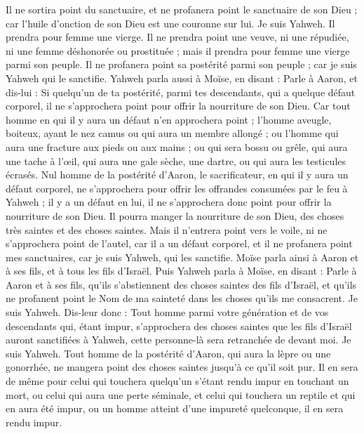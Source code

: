 \begin{multicols}{2}
Il ne sortira point du sanctuaire, et ne profanera point le sanctuaire de son Dieu ; car l'huile d'onction de son Dieu est une couronne sur lui. Je suis Yahweh.
Il prendra pour femme une vierge.
Il ne prendra point une veuve, ni une répudiée, ni une femme déshonorée ou prostituée ; mais il prendra pour femme une vierge parmi son peuple.
Il ne profanera point sa postérité parmi son peuple ; car je suis Yahweh qui le sanctifie.
Yahweh parla aussi à Moïse, en disant :
Parle à Aaron, et dis-lui : Si quelqu'un de ta postérité, parmi tes descendants, qui a quelque défaut corporel, il ne s'approchera point pour offrir la nourriture de son Dieu.
Car tout homme en qui il y aura un défaut n'en approchera point ; l'homme aveugle, boiteux, ayant le nez camus ou qui aura un membre allongé ;
ou l'homme qui aura une fracture aux pieds ou aux mains ;
ou qui sera bossu ou grêle, qui aura une tache à l'œil, qui aura une gale sèche, une dartre, ou qui aura les testicules écrasés.
Nul homme de la postérité d'Aaron, le sacrificateur, en qui il y aura un défaut corporel, ne s'approchera pour offrir les offrandes consumées par le feu à Yahweh ; il y a un défaut en lui, il ne s'approchera donc point pour offrir la nourriture de son Dieu.
Il pourra manger la nourriture de son Dieu, des choses très saintes et des choses saintes.
Mais il n'entrera point vers le voile, ni ne s'approchera point de l'autel, car il a un défaut corporel, et il ne profanera point mes sanctuaires, car je suis Yahweh, qui les sanctifie.
Moïse parla ainsi à Aaron et à ses fils, et à tous les fils d'Israël.
\VerseOne{}Puis Yahweh parla à Moïse, en disant :
Parle à Aaron et à ses fils, qu'ils s'abstiennent des choses saintes des fils d'Israël, et qu'ils ne profanent point le Nom de ma sainteté dans les choses qu'ils me consacrent. Je suis Yahweh.
Dis-leur donc : Tout homme parmi votre génération et de vos descendants qui, étant impur, s'approchera des choses saintes que les fils d'Israël auront sanctifiées à Yahweh, cette personne-là sera retranchée de devant moi. Je suis Yahweh.
Tout homme de la postérité d'Aaron, qui aura la lèpre ou une gonorrhée, ne mangera point des choses saintes jusqu'à ce qu'il soit pur. Il en sera de même pour celui qui touchera quelqu'un s'étant rendu impur en touchant un mort, ou celui qui aura une perte séminale,
et celui qui touchera un reptile et qui en aura été impur, ou un homme atteint d'une impureté quelconque, il en sera rendu impur.

\end{multicols}
